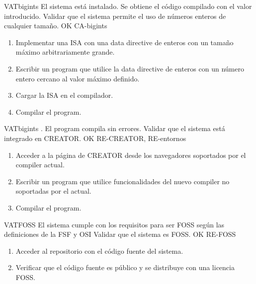 \begin{testCase}{VAT}{bigints}
    {El sistema está instalado.} %
    {Se obtiene el código compilado con el valor introducido.} %
    {Validar que el sistema permite el uso de números enteros de cualquier tamaño.} %
    {OK} %
    {CA-bigints} %
    \begin{enumerate}[leftmargin=*, topsep=0pt, noitemsep] %
        \item Implementar una \gls{ISA} con una \gls{data directive} de
        enteros con un tamaño máximo arbitrariamente grande.
        \item Escribir un \gls{program} que utilice la \gls{data directive} de
        enteros con un número entero cercano al valor máximo definido.
        \item Cargar la \gls{ISA} en el compilador.
        \item Compilar el \gls{program}.
    \end{enumerate}
\end{testCase}

\begin{testCase}{VAT}{bigints}
    {\NA.} %
    {El \gls{program} compila sin errores.} %
    {Validar que el sistema está integrado en CREATOR.} %
    {OK} %
    {RE-CREATOR, RE-entornos} %
    \begin{enumerate}[leftmargin=*, topsep=0pt, noitemsep] %
        \item Acceder a la página de CREATOR desde los navegadores soportados
        por el \gls{compiler} actual.
        \item Escribir un \gls{program} que utilice funcionalidades del nuevo
        \gls{compiler} no soportadas por el actual.
        \item Compilar el \gls{program}.
    \end{enumerate}
\end{testCase}

\begin{testCase}{VAT}{FOSS}
    {\NA} %
    {El sistema cumple con los requisitos para ser \gls{FOSS} según las
    definiciones de la \gls{FSF} \parencite{FreeSoftware} y \gls{OSI}
    \parencite{OpenSource}} %
    {Validar que el sistema es \gls{FOSS}.} %
    {OK} %
    {RE-FOSS} %
    \begin{enumerate}[leftmargin=*, topsep=0pt, noitemsep] %
        \item Acceder al repositorio con el código fuente del sistema.
        \item Verificar que el código fuente es público y se distribuye con una licencia \gls{FOSS}.
    \end{enumerate}
\end{testCase}


